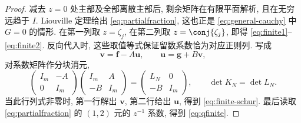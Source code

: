 \begin{proof}
减去 $z=0$ 处主部及全部离散主部后, 剩余矩阵在有限平面解析, 且在无穷远趋于 $I$. Liouville 定理给出 \eqref{eq:partialfraction}, 这也正是 \eqref{eq:general-cauchy} 中 $G=0$ 的情形. 在第一列取 $z=\zeta_j$, 在第二列取 $z=\conj{\zeta_j}$, 即得 \eqref{eq:finite1}--\eqref{eq:finite2}. 反向代入时, 这些取值等式保证留数系数恰为对应正则列. 写成
\[
\boldsymbol v=\boldsymbol f-A\boldsymbol u,\qquad
\boldsymbol u=\boldsymbol g+B\boldsymbol v,
\]
对系数矩阵作分块消元,
\[
\begin{pmatrix}I_m&-A\\0&I_m\end{pmatrix}
\begin{pmatrix}I_m&A\\-B&I_m\end{pmatrix}
=\begin{pmatrix}L_N&0\\-B&I_m\end{pmatrix},
\qquad \det K_N=\det L_N.
\]
当此行列式非零时, 第一行解出 $\boldsymbol v$, 第二行给出 $\boldsymbol u$, 得到 \eqref{eq:finite-schur}. 最后读取 \eqref{eq:partialfraction} 的 $(1,2)$ 元的 $z^{-1}$ 系数, 得到 \eqref{eq:qfinite}.
\end{proof}


